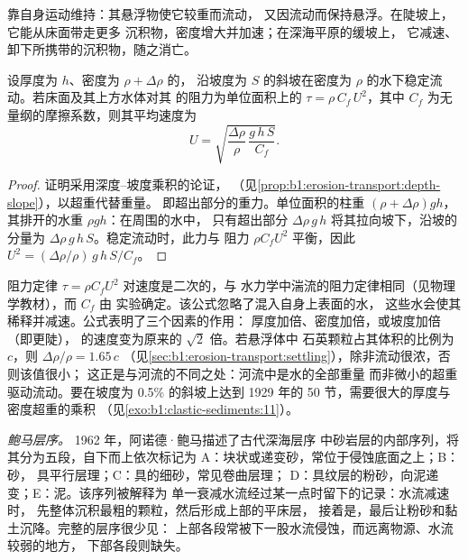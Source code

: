 靠自身运动维持：其悬浮物使它较重而流动，
又因流动而保持悬浮。在陡坡上，它能从床面带走更多
沉积物，密度增大并加速；在深海平原的缓坡上，
它减速、卸下所携带的沉积物，随之消亡。

\begin{proposition}[浊流的速度]\label{prop:b1:clastic-sediments:turbidity}
设厚度为 $h$、密度为 $\rho + \Delta\rho$ 的，
沿坡度为 $S$ 的斜坡在密度为 $\rho$ 的水下稳定流动。若床面及其上方水体对其
的阻力为单位面积上的 $\tau = \rho\,C_f\,U^2$，其中 $C_f$
为无量纲的摩擦系数，则其平均速度为
\[
  U = \sqrt{\frac{\Delta\rho}{\rho}\,\frac{g\,h\,S}{C_f}} .
\]
\end{proposition}

\begin{proof}
证明采用深度–坡度乘积的论证，
（见\cref{prop:b1:erosion-transport:depth-slope}），以超重代替重量。
即超出部分的重力。单位面积的柱重 $(\rho +
\Delta\rho) g h$，其排开的水重 $\rho g h$：在周围的水中，
只有超出部分 $\Delta\rho\,g\,h$ 将其拉向坡下，沿坡的
分量为 $\Delta\rho\,g\,h\,S$。稳定流动时，此力与
阻力 $\rho C_f U^2$ 平衡，因此 $U^2 = (\Delta\rho/\rho)\,g\,h\,S/C_f$。
\end{proof}

阻力定律 $\tau = \rho C_f U^2$ 对速度是二次的，与
水力学中湍流的阻力定律相同（见物理学教材），而 $C_f$ 由
实验确定。该公式忽略了混入自身上表面的水，
这些水会使其稀释并减速。公式表明了三个因素的作用：
厚度加倍、密度加倍，或坡度加倍（即更陡），
的速度变为原来的 $\sqrt 2$ 倍。若悬浮体中
石英颗粒占其体积的比例为 $c$，则 $\Delta\rho/\rho = 1.65\,c$
（见\cref{sec:b1:erosion-transport:settling}），除非流动很浓，否则该值很小；
这正是与河流的不同之处：河流中是水的全部重量
而非微小的超重驱动流动。要在坡度为 0.5\% 的斜坡上达到
1929 年的 50 节，需要很大的厚度与密度超重的乘积
（见\cref{exo:b1:clastic-sediments:11}）。

\emph{鲍马层序。} 1962 年，阿诺德·鲍马描述了古代深海层序
中砂岩层的内部序列，将其分为五段，自下而上依次标记为
A：块状或递变砂，常位于侵蚀底面之上；B：砂，
具平行层理；C：具的细砂，常见卷曲层理；
D：具纹层的粉砂，向泥递变；E：泥。该序列被解释为
单一衰减水流经过某一点时留下的记录：水流减速时，
先整体沉积最粗的颗粒，然后形成上部的平床层，
接着是，最后让粉砂和黏土沉降。完整的层序很少见：
上部各段常被下一股水流侵蚀，而远离物源、水流较弱的地方，
下部各段则缺失。


